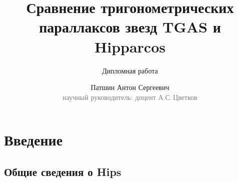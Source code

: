 \documentclass[12pt,aspectratio=43]{beamer}
\begin{document}
\title{Сравнение тригонометрических параллаксов звезд TGAS и Hipparcos}
\subtitle[Диплом]{Дипломная работа}
\author[А.С.\,Патшин]{Патшин Антон Сергеевич\\{\footnotesize\textcolor{gray}{научный руководитель: доцент А.С.\,Цветков}}}
\date{} 





\maketitle

\section{Введение}
\subsection{Общие сведения о Hips}
\label{sub:smthhip}





\end{document}
